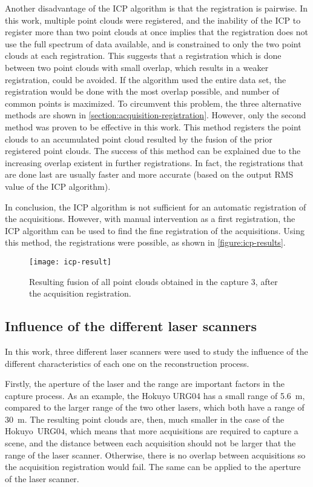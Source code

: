 Another disadvantage of the ICP algorithm is that the registration is pairwise. In this work, multiple point clouds were registered, and the inability of the ICP to register more than two point clouds at once implies that the registration does not use the full spectrum of data available, and is constrained to only the two point clouds at each registration. This suggests that a registration which is done between two point clouds with small overlap, which results in a weaker registration, could be avoided. If the algorithm used the entire data set, the registration would be done with the most overlap possible, and number of common points is maximized. To circumvent this problem, the three alternative methods are shown in \cref{section:acquisition-registration}. However, only the second method was proven to be effective in this work. This method registers the point clouds to an accumulated point cloud resulted by the fusion of the prior registered point clouds. The success of this method can be explained due to the increasing overlap existent in further registrations. In fact, the registrations that are done last are usually faster and more accurate (based on the output RMS value of the ICP algorithm).

In conclusion, the ICP algorithm is not sufficient for an automatic registration of the acquisitions. However, with manual intervention as a first registration, the ICP algorithm can be used to find the fine registration of the acquisitions. Using this method, the registrations were possible, as shown in \cref{figure:icp-results}.

\begin{figure}[h]
    
    \centering
    \texttt{[image: icp-result]}

    \caption{Resulting fusion of all point clouds obtained in the capture 3, after the acquisition registration.}
    \label{section:icp-result}

\end{figure}

\subsection{Influence of the different laser scanners}

In this work, three different laser scanners were used to study the influence of the different characteristics of each one on the reconstruction process. 

Firstly, the aperture of the laser and the range are important factors in the capture process. As an example, the Hokuyo URG04 has a small range of \SI{5.6}{\meter}, compared to the larger range of the two other lasers, which both have a range of \SI{30}{\meter}. The resulting point clouds are, then, much smaller in the case of the Hokuyo~URG04, which means that more acquisitions are required to capture a scene, and the distance between each acquisition should not be larger that the range of the laser scanner. Otherwise, there is no overlap between acquisitions so the acquisition registration would fail. The same can be applied to the aperture of the laser scanner. 

